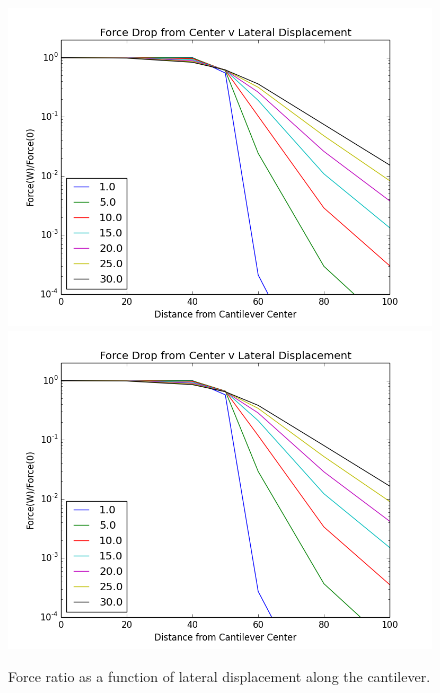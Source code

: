 \documentclass[11pt,traditabstract]{article}
\begin{document}
\begin{figure}[h]
\centering
\includegraphics[width=5in]{lateral_force_drop}
\includegraphics[width=5in]{lateral_force_drop_finite}
\caption{Force ratio as a function of lateral displacement along the cantilever.}\label{fig:latdrop}
\end{figure}
\end{document}
